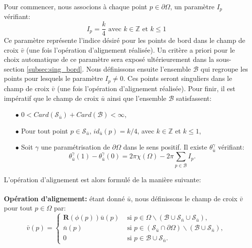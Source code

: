 Pour commencer, nous associons à chaque point $p\in\partial\Omega$, un paramètre $I_p$ vérifiant:
\begin{equation}
I_p=\displaystyle\frac{k}{4}\mbox{ avec }k\in\mathbb{Z}\mbox{ et }k\leq 1
\end{equation}
Ce paramètre représente l'indice désiré pour les points de bord dans le champ de croix $\bar{v}$ (une fois l'opération d'alignement réalisée). Un critère a priori pour le choix automatique de ce paramètre sera exposé ultérieurement dans la sous-section \ref{subsec:sing_bord}. Nous définissons ensuite l'ensemble $\mathcal{B}$ qui regroupe les points pour lesquels le paramètre $I_p\neq 0$. Ces points seront singuliers dans le champ de croix $\bar{v}$ (une fois l'opération d'alignement réalisée). %
Pour finir, il est impératif que le champ de croix $\bar{u}$ ainsi que l'ensemble $\mathcal{B}$ satisfassent:\\
\begin{itemize}
 \item[$\bullet$] $0< Card(\mathcal{S}_{\bar{u}})+Card(\mathcal{B})< \infty$,\\
 \item[$\bullet$] Pour tout point $p\in\mathcal{S}_{\bar{u}}$, $id_{\bar{u}}(p)=k/4$, avec $k\in\mathbb{Z}$ et $k\leq 1$,\\
 \item[$\bullet$] Soit $\gamma$ une paramétrisation de $\partial\Omega$ dans le sens positif. Il existe $\theta_{\bar{u}}^\gamma$ vérifiant:
 \begin{equation}
    \label{eqn:principe_hypothese_u}
    \theta_{\bar{u}}^\gamma(1)-\theta_{\bar{u}}^\gamma(0)=2\pi\chi(\Omega)-2\pi\sum_{p\in\mathcal{B}}I_p.
\end{equation}
\end{itemize}
L'opération d'alignement est alors formulé de la manière suivante:\\\\
\textbf{Opération d'alignement:} étant donné $\bar{u}$, nous définissons le champ de croix $\bar{v}$ pour tout $p\in\Omega$ par:
\begin{equation}
\bar{v}(p)=
\left\{
\begin{array}{ll}
\mathbf{R}(\phi(p))\bar{u}(p) & \mbox{ si } p\in\Omega\backslash(\mathcal{B}\cup\mathcal{S}_{\bar{n}}\cup\mathcal{S}_{\bar{u}}),\\[0.5cm]
\bar{n}(p) & \mbox{ si } p\in(\mathcal{S}_{\bar{u}}\cap\partial\Omega)\backslash(\mathcal{B}\cup\mathcal{S}_{\bar{n}}),\\[0.5cm]
0 & \mbox{ si } p\in\mathcal{B}\cup\mathcal{S}_{\bar{n}}.
\end{array}
\right.
\label{eqn:principe_def_v}
\end{equation}

